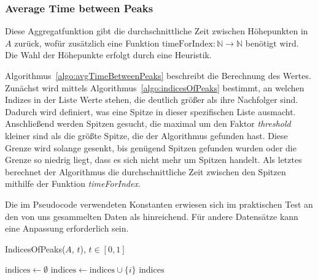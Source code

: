 \subsubsection{Average Time between Peaks}
Diese Aggregatfunktion gibt die durchschnittliche Zeit zwischen Höhepunkten in $A$ zurück, wofür zusätzlich eine Funktion $\text{timeForIndex}: \mathbb{N} \to \mathbb{N}$ benötigt wird. Die Wahl der Höhepunkte erfolgt durch eine Heuristik. 

Algorithmus~\ref{algo:avgTimeBetweenPeaks} beschreibt die Berechnung des Wertes. Zunächst wird mittels Algorithmus~\ref{algo:indicesOfPeaks} bestimmt, an welchen Indizes in der Liste Werte stehen, die deutlich größer als ihre Nachfolger sind. Dadurch wird definiert, was eine Spitze in dieser spezifischen Liste ausmacht. Anschließend werden Spitzen gesucht, die maximal um den Faktor \textit{threshold} kleiner sind als die größte Spitze, die der Algorithmus gefunden hast. Diese Grenze wird solange gesenkt, bis genügend Spitzen gefunden wurden oder die Grenze so niedrig liegt, dass es sich nicht mehr um Spitzen handelt. Als letztes berechnet der Algorithmus die durchschnittliche Zeit zwischen den Spitzen mithilfe der Funktion \textit{timeForIndex}.

Die im Pseudocode verwendeten Konstanten erwiesen sich im praktischen Test an den von uns gesammelten Daten als hinreichend. Für andere Datensätze kann eine Anpassung erforderlich sein.

\begin{algorithm}
    \caption{IndicesOfPeaks($A$, $t$), $t \in [0,1]$}
    \label{algo:indicesOfPeaks}
    \begin{algorithmic}
        \State $\text{indices} \gets \emptyset$
                \State $\text{indices} \gets \text{indices} \cup \{i\}$
            \EndIf
        \EndFor
        \State \Return $\text{indices}$
    \end{algorithmic}
\end{algorithm}

